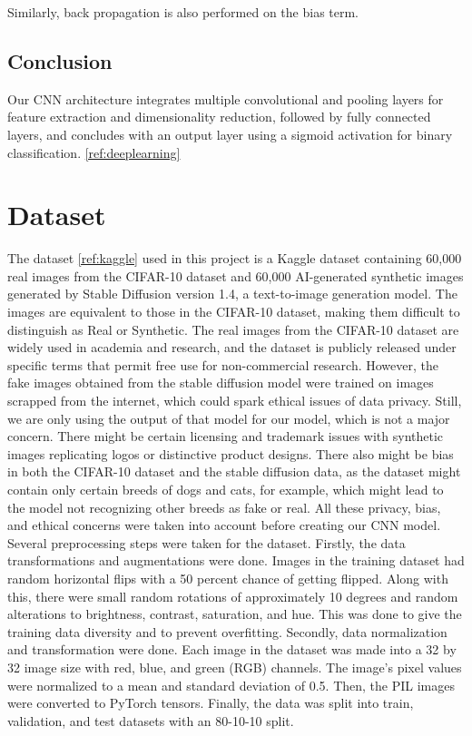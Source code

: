 \documentclass[11pt]{article}
\begin{document}
Similarly, back propagation is also performed on the bias term. 

\subsection{Conclusion}

Our CNN architecture integrates multiple convolutional and pooling layers for feature extraction and dimensionality reduction, followed by fully connected layers, and concludes with an output layer using a sigmoid activation for binary classification. \ref{ref:deeplearning}

\section{Dataset}

The dataset \ref{ref:kaggle} used in this project is a Kaggle dataset containing 60,000 real images from the CIFAR-10 dataset and 60,000 AI-generated synthetic images generated by Stable Diffusion version 1.4, a text-to-image generation model. The images are equivalent to those in the CIFAR-10 dataset, making them difficult to distinguish as Real or Synthetic. The real images from the CIFAR-10 dataset are widely used in academia and research, and the dataset is publicly released under specific terms that permit free use for non-commercial research. However, the fake images obtained from the stable diffusion model were trained on images scrapped from the internet, which could spark ethical issues of data privacy. Still, we are only using the output of that model for our model, which is not a major concern. There might be certain licensing and trademark issues with synthetic images replicating logos or distinctive product designs. There also might be bias in both the CIFAR-10 dataset and the stable diffusion data, as the dataset might contain only certain breeds of dogs and cats, for example, which might lead to the model not recognizing other breeds as fake or real. All these privacy, bias, and ethical concerns were taken into account before creating our CNN model. \\

Several preprocessing steps were taken for the dataset. Firstly, the data transformations and augmentations were done. Images in the training dataset had random horizontal flips with a 50 percent chance of getting flipped. Along with this, there were small random rotations of approximately 10 degrees and random alterations to brightness, contrast, saturation, and hue. This was done to give the training data diversity and to prevent overfitting. Secondly, data normalization and transformation were done. Each image in the dataset was made into a 32 by 32 image size with red, blue, and green (RGB) channels. The image's pixel values were normalized to a mean and standard deviation of 0.5. Then, the PIL images were converted to PyTorch tensors. Finally, the data was split into train, validation, and test datasets with an 80-10-10 split. \\
\end{document}
